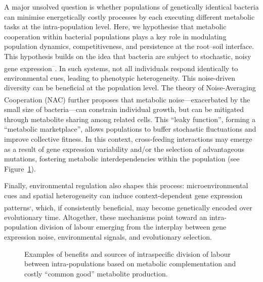 \documentclass[
  11pt,
  a4paper,
]{report}
\begin{document}
A major unsolved question is whether populations of genetically
identical bacteria can minimise energetically costly processes by each
executing different metabolic tasks at the intra-population level. Here,
we hypothesise that metabolic cooperation within bacterial populations
plays a key role in modulating population dynamics, competitiveness, and
persistence at the root--soil interface. This hypothesis builds on the
idea that bacteria are subject to stochastic, noisy gene
expression\textsuperscript{--}.
In such systems, not all individuals respond identically to
environmental cues, leading to phenotypic heterogeneity. This
noise-driven diversity can be beneficial at the population level. The
theory of Noise-Averaging Cooperation
(NAC)\textsuperscript{} further proposes
that metabolic noise---exacerbated by the small size of bacteria---can
constrain individual growth, but can be mitigated through metabolite
sharing among related cells. This ``leaky function'', forming a
``metabolic marketplace'', allows populations to buffer stochastic
fluctuations and improve collective fitness. In this context,
cross-feeding interactions may emerge as a result of gene expression
variability and/or the selection of advantageous mutations, fostering
metabolic interdependencies within the population (see
Figure~\ref{fig-intraspecific-DoL}).

Finally, environmental regulation also shapes this process:
microenvironmental cues and spatial heterogeneity can induce
context-dependent gene expression
patterns\textsuperscript{,},
which, if consistently beneficial, may become genetically encoded over
evolutionary time. Altogether, these mechanisms point toward an
intra-population division of labour emerging from the interplay between
gene expression noise, environmental signals, and evolutionary
selection.

\begin{figure}


\caption{\label{fig-intraspecific-DoL}Examples of benefits and sources
of intraspecific division of labour between intra-populations based on
metabolic complementation and costly ``common good'' metabolite
production.}

\end{figure}%
\end{document}
